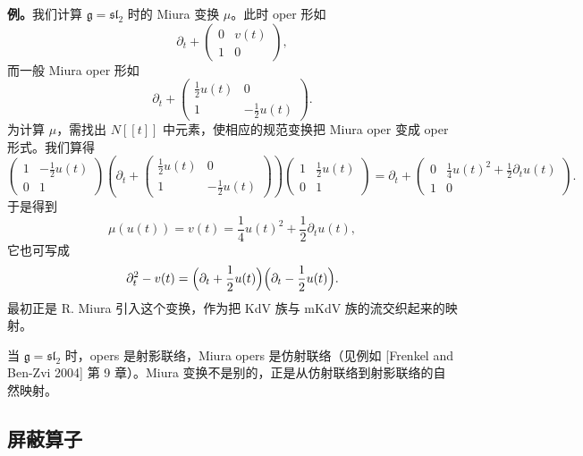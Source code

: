 \textbf{例。}我们计算 $\mathfrak g=\mathfrak{sl}_2$ 时的 Miura 变换 $\mu$。此时 oper 形如
\[
    \partial_t+\begin{pmatrix}0&v(t)\\1&0\end{pmatrix},
\]
而一般 Miura oper 形如
\[
    \partial_t+\begin{pmatrix}\frac12u(t)&0\\1&-\frac12u(t)\end{pmatrix}.
\]
为计算 $\mu$，需找出 $N[\![t]\!]$ 中元素，使相应的规范变换把 Miura oper 变成 oper 形式。我们算得
\[
    \begin{pmatrix}1&-\frac12u(t)\\0&1\end{pmatrix}
    \left(\partial_t+\begin{pmatrix}\frac12u(t)&0\\1&-\frac12u(t)\end{pmatrix}\right)
    \begin{pmatrix}1&\frac12u(t)\\0&1\end{pmatrix}
    =\partial_t+\begin{pmatrix}0&\frac14u(t)^2+\frac12\partial_tu(t)\\1&0\end{pmatrix}.
\]
于是得到
\[
    \mu(u(t))=v(t)=\frac14u(t)^2+\frac12\partial_tu(t),
\]
它也可写成
\[
    \partial_t^2-v(t)=\Bigl(\partial_t+\frac12u(t)\Bigr)\Bigl(\partial_t-\frac12u(t)\Bigr).
\]
最初正是 R. Miura 引入这个变换，作为把 KdV 族与 mKdV 族的流交织起来的映射。

当 $\mathfrak g=\mathfrak{sl}_2$ 时，opers 是射影联络，Miura opers 是仿射联络（见例如 [Frenkel and Ben-Zvi 2004] 第 9 章）。Miura 变换不是别的，正是从仿射联络到射影联络的自然映射。


\subsection{屏蔽算子}

